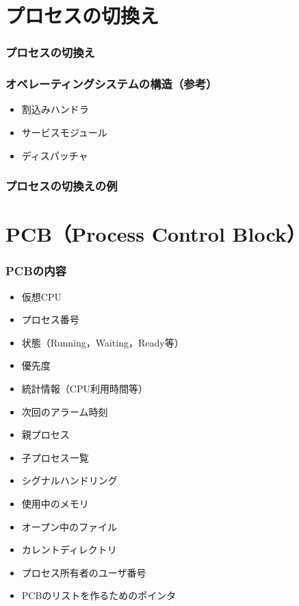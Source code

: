 \documentclass[unicode]{beamer}                   %
\begin{document}
\section{プロセスの切換え}
\begin{frame}
  \frametitle{プロセスの切換え}
\end{frame}

\begin{frame}
  \frametitle{オペレーティングシステムの構造（参考）}
  \begin{itemize}
    \item 割込みハンドラ
    \item サービスモジュール
    \item ディスパッチャ
  \end{itemize}
\end{frame}

\begin{frame}
  \frametitle{プロセスの切換えの例}
\end{frame}

\section{PCB（Process Control Block）}
\begin{frame}
  \frametitle{PCBの内容}
\begin{itemize}
\item 仮想CPU
\item プロセス番号
\item 状態（Running，Waiting，Ready等）
\item 優先度
\item 統計情報（CPU利用時間等）
\item 次回のアラーム時刻
\item 親プロセス
\item 子プロセス一覧
\item シグナルハンドリング
\item 使用中のメモリ
\item オープン中のファイル
\item カレントディレクトリ
\item プロセス所有者のユーザ番号
\item PCBのリストを作るためのポインタ
\end{itemize}
\end{frame}
\end{document}
